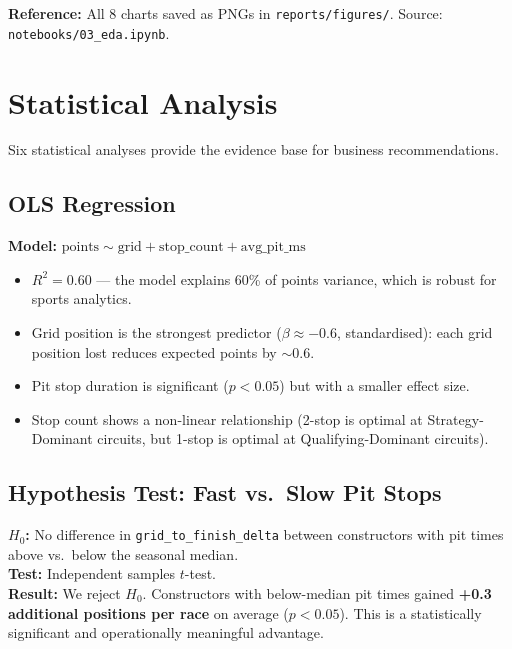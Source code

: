 \documentclass[12pt, a4paper]{article}
\begin{document}
\textbf{Reference:} All 8 charts saved as PNGs in \texttt{reports/figures/}. Source: \texttt{notebooks/03\_eda.ipynb}.

\newpage

\section{Statistical Analysis}

Six statistical analyses provide the evidence base for business recommendations.

\subsection{OLS Regression}
\textbf{Model:} $\text{points} \sim \text{grid} + \text{stop\_count} + \text{avg\_pit\_ms}$

\begin{itemize}[noitemsep]
    \item $R^2 = 0.60$ --- the model explains 60\% of points variance, which is robust for sports analytics.
    \item Grid position is the strongest predictor ($\beta \approx -0.6$, standardised): each grid position lost reduces expected points by $\sim$0.6.
    \item Pit stop duration is significant ($p < 0.05$) but with a smaller effect size.
    \item Stop count shows a non-linear relationship (2-stop is optimal at Strategy-Dominant circuits, but 1-stop is optimal at Qualifying-Dominant circuits).
\end{itemize}

\subsection{Hypothesis Test: Fast vs.\ Slow Pit Stops}
\textbf{$H_0$:} No difference in \texttt{grid\_to\_finish\_delta} between constructors with pit times above vs.\ below the seasonal median.\\
\textbf{Test:} Independent samples $t$-test.\\
\textbf{Result:} We reject $H_0$. Constructors with below-median pit times gained \textbf{+0.3 additional positions per race} on average ($p < 0.05$). This is a statistically significant and operationally meaningful advantage.
\end{document}
